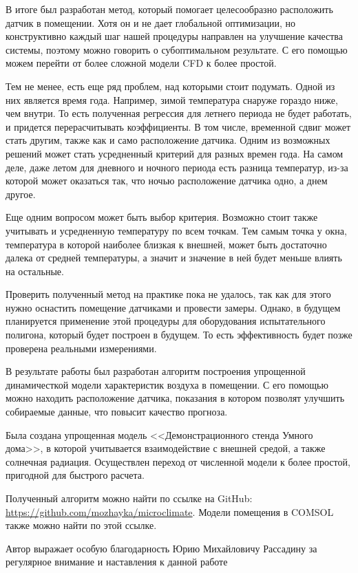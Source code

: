 
В итоге был разработан метод, который помогает целесообразно расположить датчик в помещении. Хотя он и не дает глобальной оптимизации, но конструктивно каждый шаг нашей процедуры направлен на улучшение качества системы, поэтому можно говорить о субоптимальном результате. С его помощью можем перейти от более сложной модели CFD к более простой.

Тем не менее, есть еще ряд проблем, над которыми стоит подумать. Одной из них является время года. Например, зимой температура снаруже гораздо ниже, чем внутри. То есть полученная регрессия для летнего периода не будет работать, и придется перерасчитывать коэффициенты. В том числе, временной сдвиг может стать другим, также как и само расположение датчика. Одним из возможных решений может стать усредненный критерий для разных времен года. На самом деле, даже летом для дневного и ночного периода есть разница температур, из-за которой может оказаться так, что ночью расположение датчика одно, а днем другое.

Еще одним вопросом может быть выбор критерия. Возможно стоит также учитывать и усредненную температуру по всем точкам. Тем самым точка у окна, температура в которой наиболее близкая к внешней, может быть достаточно далека от средней температуры, а значит и значение в ней будет меньше влиять на остальные.

Проверить полученный метод на практике пока не удалось, так как для этого нужно оснастить помещение датчиками и провести замеры. Однако, в будущем планируется применение этой процедуры для оборудования испытательного полигона, который будет построен в будущем. То есть эффективность будет позже проверена реальными измерениями.

\newpage


В результате работы был разработан алгоритм построения упрощенной динамичесткой модели характеристик воздуха в помещении. С его помощью можно находить расположение датчика, показания в котором позволят улучшить собираемые данные, что повысит качество прогноза.

Была создана упрощенная модель <<Демонстрационного стенда Умного дома>>, в которой учитывается взаимодействие с внешней средой, а также солнечная радиация. Осуществлен переход от численной модели к более простой, пригодной для быстрого расчета.

Полученный алгоритм можно найти по ссылке на GitHub: \url{https://github.com/mozhayka/microclimate}. Модели помещения в COMSOL также можно найти по этой ссылке.

\newpage


Автор выражает особую благодарность Юрию Михайловичу Рассадину за регулярное внимание и наставления к данной работе